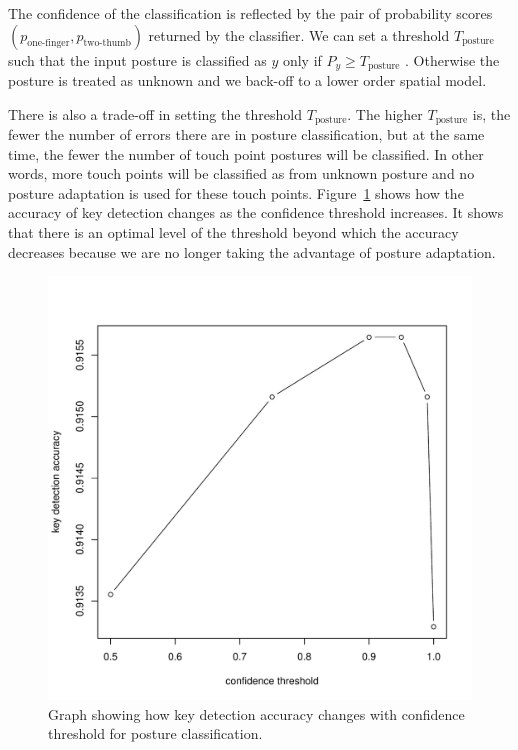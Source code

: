 \documentclass{sigchi}
\begin{document}
The confidence of the classification is reflected by the pair of probability 
scores $(p_{\text{one-finger}}, p_{\text{two-thumb}})$ returned by the classifier. 
We can set a threshold $T_{\text{posture}}$ such that the input posture is classified
as $y$ only if $P_y \ge T_{\text{posture}}$ . Otherwise the posture is treated as
unknown and we back-off to a lower order spatial model.

There is also a trade-off in setting the threshold $T_{\text{posture}}$. The higher
 $T_{\text{posture}}$ is, the fewer the number of errors there are in posture classification, but at the same time,
 the fewer the number of touch point postures will be classified. In other words, 
 more touch points will be classified as from unknown posture and no posture adaptation 
 is used for these touch points. Figure~\ref{fig:posture-confidence} shows how
 the accuracy of key detection changes as the confidence threshold increases. It 
 shows that there is an optimal level of the threshold beyond which the accuracy
 decreases because we are no longer taking the advantage of posture adaptation.

\begin{figure}[tb]
 \includegraphics[width=1\columnwidth]{figures/posture-confidence.pdf}
  \caption{Graph showing how key detection accuracy changes with confidence
  threshold for posture classification.}
  \label{fig:posture-confidence}
\end{figure}
\end{document}
